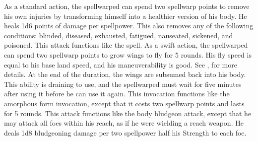 As a standard action, the spellwarped can spend two spellwarp points to remove his own injuries by transforming himself into a healthier version of his body.
He heals 1d6 points of damage per spellpower.
This also removes any of the following conditions: blinded, diseased, exhausted, fatigued, nauseated, sickened, and poisoned.
 This attack functions like the 
spell.
As a swift action, the spellwarped can spend two spellwarp points to grow wings to fly for 5 rounds.
His fly speed is equal to his base land speed, and his maneuverability is good.
See , for more details.
At the end of the duration, the wings are subsumed back into his body.
This ability is draining to use, and the spellwarped must wait for five minutes after using it before he can use it again.
This invocation functions like the amorphous form invocation, except that it costs two spellwarp points and lasts for 5 rounds.
This attack functions like the body bludgeon attack, except that he may attack all foes within his reach, as if he were wielding a reach weapon.
He deals 1d8 bludgeoning damage per two spellpower \add half his Strength to each foe.

